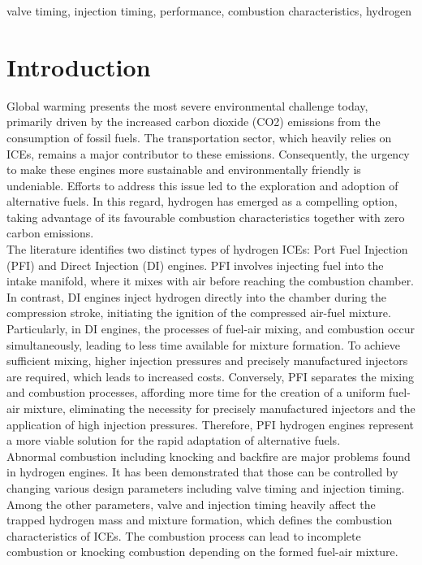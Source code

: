 \documentclass[conference]{IEEEtran}
\begin{document}
\begin{IEEEkeywords}
valve timing, injection timing, performance, combustion characteristics, hydrogen
\end{IEEEkeywords}

\section{Introduction}

Global warming presents the most severe environmental challenge today, primarily driven by the increased carbon dioxide (CO2) emissions from the consumption of fossil fuels.
The transportation sector, which heavily relies on ICEs, remains a major contributor to these emissions.
Consequently, the urgency to make these engines more sustainable and environmentally friendly is undeniable.
Efforts to address this issue led to the exploration and adoption of alternative fuels.
In this regard, hydrogen has emerged as a compelling option, taking advantage of its favourable combustion characteristics together with zero carbon emissions.\\

The literature identifies two distinct types of hydrogen ICEs: Port Fuel Injection (PFI) and Direct Injection (DI) engines.
PFI involves injecting fuel into the intake manifold, where it mixes with air before reaching the combustion chamber.
In contrast, DI engines inject hydrogen directly into the chamber during the compression stroke, initiating the ignition of the compressed air-fuel mixture.
Particularly, in DI engines, the processes of fuel-air mixing, and combustion occur simultaneously, leading to less time available for mixture formation.
To achieve sufficient mixing, higher injection pressures and precisely manufactured injectors are required, which leads to increased costs.
Conversely, PFI separates the mixing and combustion processes, affording more time for the creation of a uniform fuel-air mixture, eliminating the necessity for precisely manufactured injectors and the application of high injection pressures.
Therefore, PFI hydrogen engines represent a more viable solution for the rapid adaptation of alternative fuels.\\

Abnormal combustion including knocking and backfire are major problems found in hydrogen engines.
It has been demonstrated that those can be controlled by changing various design parameters including valve timing and injection timing.
Among the other parameters, valve and injection timing heavily affect the trapped hydrogen mass and mixture formation, which defines the combustion characteristics of ICEs.
The combustion process can lead to incomplete combustion or knocking combustion depending on the formed fuel-air mixture.\\
\end{document}

